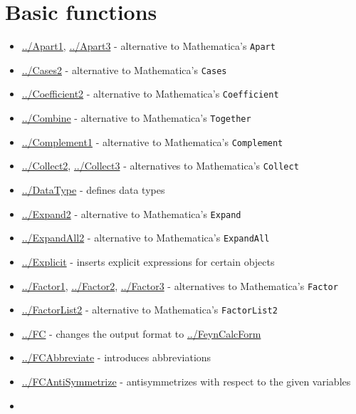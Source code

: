 \documentclass[../FeynCalcManual.tex]{subfiles}
\begin{document}
\hypertarget{basic functions}{
\section{Basic functions}\label{basic functions}}

\begin{itemize}
\tightlist
\item
  \hyperlink{../apart1}{../Apart1}, \hyperlink{../apart3}{../Apart3} -
  alternative to Mathematica's \texttt{Apart}
\item
  \hyperlink{../cases2}{../Cases2} - alternative to Mathematica's
  \texttt{Cases}
\item
  \hyperlink{../coefficient2}{../Coefficient2} - alternative to
  Mathematica's \texttt{Coefficient}
\item
  \hyperlink{../combine}{../Combine} - alternative to Mathematica's
  \texttt{Together}
\item
  \hyperlink{../complement1}{../Complement1} - alternative to
  Mathematica's \texttt{Complement}
\item
  \hyperlink{../collect2}{../Collect2},
  \hyperlink{../collect3}{../Collect3} - alternatives to Mathematica's
  \texttt{Collect}
\item
  \hyperlink{../datatype}{../DataType} - defines data types
\item
  \hyperlink{../expand2}{../Expand2} - alternative to Mathematica's
  \texttt{Expand}
\item
  \hyperlink{../expandall2}{../ExpandAll2} - alternative to
  Mathematica's \texttt{ExpandAll}
\item
  \hyperlink{../explicit}{../Explicit} - inserts explicit expressions
  for certain objects
\item
  \hyperlink{../factor1}{../Factor1},
  \hyperlink{../factor2}{../Factor2}, \hyperlink{../factor3}{../Factor3}
  - alternatives to Mathematica's \texttt{Factor}
\item
  \hyperlink{../factorlist2}{../FactorList2} - alternative to
  Mathematica's \texttt{FactorList2}
\item
  \hyperlink{../fc}{../FC} - changes the output format to
  \hyperlink{../feyncalcform}{../FeynCalcForm}
\item
  \hyperlink{../fcabbreviate}{../FCAbbreviate} - introduces
  abbreviations
\item
  \hyperlink{../fcantisymmetrize}{../FCAntiSymmetrize} - antisymmetrizes
  with respect to the given variables
\item

\end{itemize}
\end{document}
